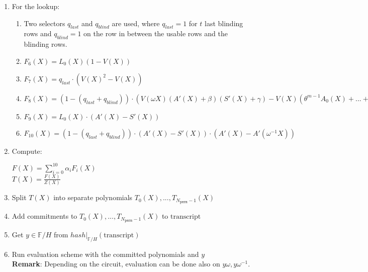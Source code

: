 \begin{enumerate}
\begin{center}
            $F_2(X) = P(X)p'(X) - P(X\omega)$ \\
            $F_3(X) = Q(X)q'(X) - Q(X\omega)$ \\
            $F_4(X) = L_n(X)(P(X\omega) - Q(X\omega))$ \\
            $F_5(X) = \sum\limits_{0 \leq i < N_{\texttt{sel}}} (\textbf{q}_{i}(X) \cdot \texttt{gate}_i(X))
            + \sum\limits_{0 \leq i < N_{\texttt{const}}}(\textbf{f}_{c_i}(X)) + PI(X)$
        \end{center}
    \item For the lookup:
        \begin{enumerate}
            \item Two selectors $q_{last}$ and $q_{blind}$ are used, where $q_{last} = 1$ for $t$ last blinding rows and $q_{blind} = 1$ on the row in between the usable rows and the blinding rows.
            \item $F_6(X) = L_0(X) (1 - V(X))$
            \item $F_7(X) = q_{last} \cdot (V(X)^2 - V(X))$
            \item $F_8(X) = (1 - (q_{last} + q_{blind})) \cdot ( V(\omega X) (A'(X) + \beta) (S'(X) + \gamma) - V(X) (\theta^{m-1} A_0(X) + ... + A_{m-1}(X) + \beta) (\theta^{m-1} S_0(X) + ... + S_{m-1}(X) + \gamma) )$
            \item $F_9(X) = L_0(X) \cdot (A'(X) - S'(X))$
            \item $F_{10}(X) = (1 - (q_{last} + q_{blind})) \cdot (A'(X) - S'(X))\cdot(A'(X) - A'(\omega^{-1} X))$
        \end{enumerate}
    \item Compute:
        \begin{center}
            $F(X) = \sum\limits_{i = 0}^{10} \alpha_iF_i(X)$ \\
            $T(X) = \frac{F(X)}{Z(X)}$
        \end{center}
    \item Split $T(X)$ into separate polynomials $T_0(X), ..., T_{N_{\texttt{perm}} - 1}(X)$
    \item Add commitments to $T_0(X), ..., T_{N_{\texttt{perm}} - 1}(X)$ to $\text{transcript}$
    \item Get $y \in \mathbb{F}/H$ from $hash|_{\mathbb{F}/H}(\text{transcript})$
    \item Run evaluation scheme with the committed polynomials and $y$ \\
        \textbf{Remark}: Depending on the circuit, evaluation can be done also on $y\omega, y\omega^{-1}$.

\end{enumerate}
